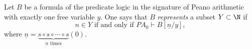 \begin{dfn}
Let $B$ be a formula of the predicate logic in the signature of Peano arithmetic with exactly one free variable $y$.
One says that $B$ \emph{represents} a subset $Y \subset \N$ if
\[
n \in Y \text{ if and only if }PA_0 \vdash B[\underline{n}/y],
\]
where $\underline{n} = \underbrace{s \circ s \circ \cdots \circ s}_{n\text{ times}}(0)$.
\end{dfn}
